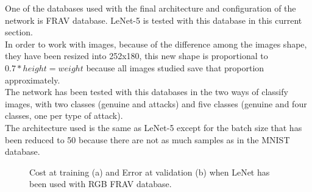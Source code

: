 One of the databases used with the final architecture and configuration of the network is FRAV database. LeNet-5 is tested with this database in this current section.\\

In order to work with images, because of the difference among the images shape, they have been resized into 252x180, this new shape is proportional to $0.7*height = weight$ because all images studied save that proportion approximately.\\

The network has been tested with this databases in the two ways of classify images, with two classes (genuine and attacks) and five classes (genuine and four classes, one per type of attack).\\ %

The architecture used is the same as LeNet-5 except for the batch size that has been reduced to 50 because there are not as much samples as in the MNIST database.\\

\begin{figure}[htb]
\centering
{}
\caption{Cost at training (a) and Error at validation (b) when LeNet has been used with RGB FRAV database.}
\label{fig:Lenet_FRAV}
\end{figure}


